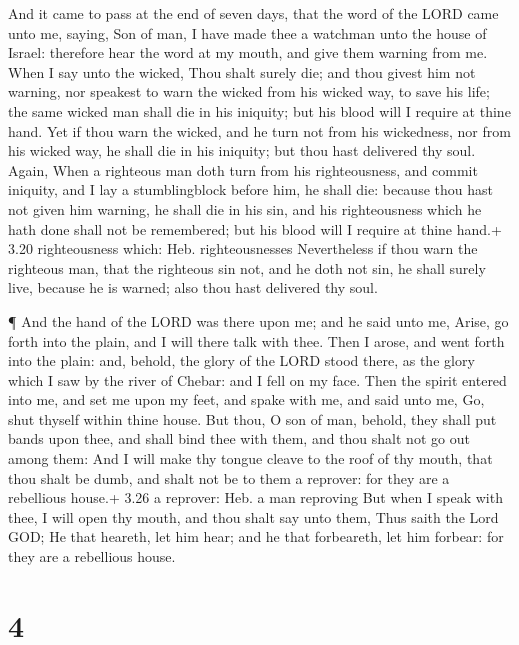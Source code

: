  And it came to pass at the end of seven days, that the
word of the LORD came unto me, saying,  Son of man, I have
made thee a watchman unto the house of Israel: therefore hear the word
at my mouth, and give them warning from me.  When I say
unto the wicked, Thou shalt surely die; and thou givest him not warning,
nor speakest to warn the wicked from his wicked way, to save his life;
the same wicked man shall die in his iniquity; but his blood will I
require at thine hand.  Yet if thou warn the wicked, and he
turn not from his wickedness, nor from his wicked way, he shall die in
his iniquity; but thou hast delivered thy soul.  Again,
When a righteous man doth turn from his righteousness, and commit
iniquity, and I lay a stumblingblock before him, he shall die: because
thou hast not given him warning, he shall die in his sin, and his
righteousness which he hath done shall not be remembered; but his blood
will I require at thine hand.+ 3.20 righteousness which: Heb.
righteousnesses  Nevertheless if thou warn the righteous
man, that the righteous sin not, and he doth not sin, he shall surely
live, because he is warned; also thou hast delivered thy soul.

 ¶ And the hand of the LORD was there upon me; and he said
unto me, Arise, go forth into the plain, and I will there talk with
thee.  Then I arose, and went forth into the plain: and,
behold, the glory of the LORD stood there, as the glory which I saw by
the river of Chebar: and I fell on my face.  Then the
spirit entered into me, and set me upon my feet, and spake with me, and
said unto me, Go, shut thyself within thine house.  But
thou, O son of man, behold, they shall put bands upon thee, and shall
bind thee with them, and thou shalt not go out among them: 
And I will make thy tongue cleave to the roof of thy mouth, that thou
shalt be dumb, and shalt not be to them a reprover: for they are a
rebellious house.+ 3.26 a reprover: Heb. a man reproving 
But when I speak with thee, I will open thy mouth, and thou shalt say
unto them, Thus saith the Lord GOD; He that heareth, let him hear; and
he that forbeareth, let him forbear: for they are a rebellious house.

\hypertarget{section-3}{%
\section{4}\label{section-3}}

